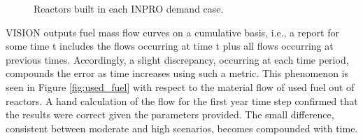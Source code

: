 \begin{figure}[ht]
  \centering
  \quad
\caption{Reactors built in each INPRO demand case.}
\label{fig:rxtrs}
\end{figure}

VISION outputs fuel mass flow curves on a cumulative basis, i.e., a report for
some time t includes the flows occurring at time t plus all flows occurring at
previous times. Accordingly, a slight discrepancy, occurring at each time period,
compounds the error as time increases using such a metric. This phenomenon is
seen in Figure \ref{fig:used_fuel} with respect to the material flow of used
fuel out of reactors. A hand calculation of the flow for the first year time
step confirmed that the \Cyclus results were correct given the parameters
provided. The small difference, consistent between moderate and high scenarios,
becomes compounded with time. 

